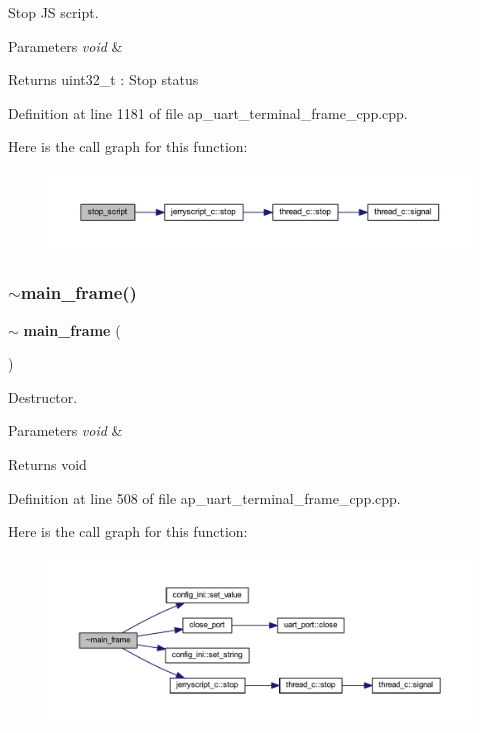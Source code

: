 Stop JS script. 


\begin{DoxyParams}{Parameters}
{\em void} & \\
\hline
\end{DoxyParams}
\begin{DoxyReturn}{Returns}
uint32\+\_\+t \+: Stop status 
\end{DoxyReturn}


Definition at line 1181 of file ap\+\_\+uart\+\_\+terminal\+\_\+frame\+\_\+cpp.\+cpp.

Here is the call graph for this function\+:
\nopagebreak
\begin{figure}[H]
\begin{center}
\leavevmode
\includegraphics[width=350pt]{group___u_a_r_t__terminal_ga1ef808eaa046bca8db8019bc788a7f3f_cgraph}
\end{center}
\end{figure}
\mbox{\label{group___u_a_r_t__terminal_gaf3820c86d5633619d8e1baddfcbb5042}} 
\subsubsection{$\sim$main\_frame()}
{\footnotesize\ttfamily $\sim$\textbf{ main\+\_\+frame} (\begin{DoxyParamCaption}{ }\end{DoxyParamCaption})\hspace{0.3cm}{\ttfamily [virtual]}}



Destructor. 


\begin{DoxyParams}{Parameters}
{\em void} & \\
\hline
\end{DoxyParams}
\begin{DoxyReturn}{Returns}
void 
\end{DoxyReturn}


Definition at line 508 of file ap\+\_\+uart\+\_\+terminal\+\_\+frame\+\_\+cpp.\+cpp.

Here is the call graph for this function\+:
\nopagebreak
\begin{figure}[H]
\begin{center}
\leavevmode
\includegraphics[width=350pt]{group___u_a_r_t__terminal_gaf3820c86d5633619d8e1baddfcbb5042_cgraph}
\end{center}
\end{figure}
